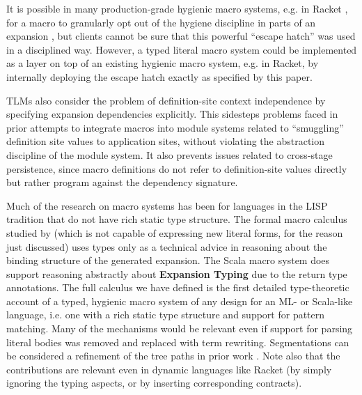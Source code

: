 \documentclass[acmsmall,screen]{acmart}
\newcommand{\li}[1]{\lstinline[basicstyle=\ttfamily\fontsize{9pt}{1em}\selectfont]{#1}}
\begin{document}

It is  possible in many production-grade hygienic macro systems, e.g. in Racket \cite{Flatt:2012:CLR:2063176.2063195}, for a macro to granularly opt out of the hygiene discipline in parts of an expansion \cite{kiselyov2002write}, but clients cannot be sure that this powerful ``escape hatch'' was used in a disciplined way. However, a typed literal macro system could be implemented as a layer on top of an existing hygienic macro system, e.g. in Racket, by internally deploying the escape hatch exactly as specified by this paper. %


TLMs also consider the problem of definition-site context independence by specifying expansion dependencies explicitly. This sidesteps problems faced in prior attempts to integrate macros into module systems \cite{culpepper2005syntactic} related to ``smuggling'' definition site values to application sites, without violating the abstraction discipline of the module system. It also prevents issues related to cross-stage persistence, since macro definitions do not refer to definition-site values directly but rather program against the dependency signature.

Much of the research on macro systems has been for languages in the LISP tradition \cite{mccarthy1978history} that do not have rich static type structure. The formal macro calculus studied by \citet{DBLP:conf/esop/HermanW08} (which is not capable of expressing new literal forms, for the reason just discussed) uses types only as a technical advice in reasoning about the binding structure of the generated expansion. The Scala macro system does support reasoning abstractly about \textbf{Expansion Typing} due to the return type annotations. The full calculus we have defined is the first detailed type-theoretic account of a typed, hygienic macro system of any design for an ML- or Scala-like language, i.e. one with a rich static type structure and support for pattern matching. Many of the mechanisms would be relevant even if support for parsing literal bodies was removed and replaced with term rewriting. Segmentations can be considered a refinement of the tree paths in prior work \cite{Herman10:Theory,gorn1965explicit}.  Note also that the contributions are relevant even in dynamic languages like Racket 
(by simply ignoring the typing aspects, or by inserting corresponding 
contracts).
\end{document}
